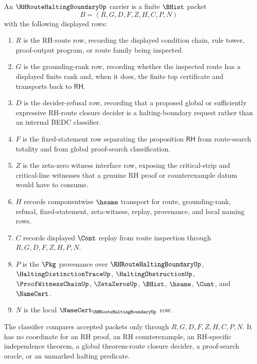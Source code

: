 \begin{definition}
\label{def:rh-route-halting-boundary-carrier}
An $\RHRouteHaltingBoundaryUp$ carrier is a finite $\BHist$ packet
$$
B=(R,G,D,F,Z,H,C,P,N)
$$
with the following displayed rows:
\begin{enumerate}
\item $R$ is the RH-route row, recording the displayed condition chain, rule tower, proof-output program, or route family being inspected.
\item $G$ is the grounding-rank row, recording whether the inspected route has a displayed finite rank and, when it does, the finite top certificate and transports back to $\mathsf{RH}$.
\item $D$ is the decider-refusal row, recording that a proposed global or sufficiently expressive RH-route closure decider is a halting-boundary request rather than an internal BEDC classifier.
\item $F$ is the fixed-statement row separating the proposition $\mathsf{RH}$ from route-search totality and from global proof-search classification.
\item $Z$ is the zeta-zero witness interface row, exposing the critical-strip and critical-line witnesses that a genuine RH proof or counterexample datum would have to consume.
\item $H$ records componentwise $\hsame$ transport for route, grounding-rank, refusal, fixed-statement, zeta-witness, replay, provenance, and local naming rows.
\item $C$ records displayed $\Cont$ replay from route inspection through $R,G,D,F,Z,H,P,N$.
\item $P$ is the $\Pkg$ provenance over $\RHRouteHaltingBoundaryUp$, $\HaltingDistinctionTraceUp$, $\HaltingObstructionUp$, $\ProofWitnessChainUp$, $\ZetaZerosUp$, $\BHist$, $\hsame$, $\Cont$, and $\NameCert$.
\item $N$ is the local $\NameCert_{\RHRouteHaltingBoundaryUp}$ row.
\end{enumerate}
The classifier compares accepted packets only through $R,G,D,F,Z,H,C,P,N$. It has no coordinate for an RH proof, an RH counterexample, an RH-specific independence theorem, a global theorem-route closure decider, a proof-search oracle, or an unmarked halting predicate.
\end{definition}

